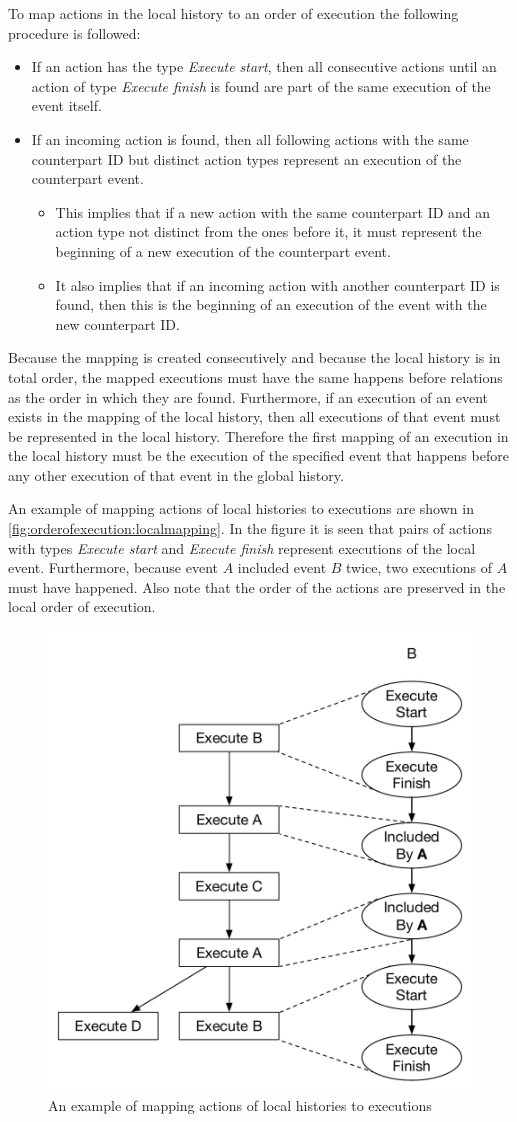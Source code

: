 	\newpar To map actions in the local history to an order of execution the following procedure is followed:

	\begin{itemize}
		\item If an action has the type \textit{Execute start}, then all consecutive actions until an action of type \textit{Execute finish} is found are part of the same execution of the event itself.
		\item If an incoming action is found, then all following actions with the same counterpart ID but distinct action types represent an execution of the counterpart event.
		\begin{itemize}
			\item This implies that if a new action with the same counterpart ID and an action type not distinct from the ones before it, it must represent the beginning of a new execution of the counterpart event.
			\item It also implies that if an incoming action with another counterpart ID is found, then this is the beginning of an execution of the event with the new counterpart ID.
		\end{itemize}
	\end{itemize}
	
	\noindent Because the mapping is created consecutively and because the local history is in total order, the mapped executions must have the same happens before relations as the order in which they are found. Furthermore, if an execution of an event exists in the mapping of the local history, then all executions of that event must be represented in the local history. Therefore the first mapping of an execution in the local history must be the execution of the specified event that  happens before any other execution of that event in the global history.
	
	An example of mapping actions of local histories to executions are shown in \autoref{fig:orderofexecution:localmapping}. In the figure it is seen that pairs of actions with types \textit{Execute start} and \textit{Execute finish} represent executions of the local event. Furthermore, because event $A$ included event $B$ twice, two executions of $A$ must have happened. Also note that the order of the actions are preserved in the local order of execution.
	
	\begin{figure}[H]
		\centering
		\includegraphics[width=.4\textwidth]{5orderofexecution/images/election-mapping.pdf}
		\caption{An example of mapping actions of local histories to executions}
		\label{fig:orderofexecution:localmapping}
	\end{figure}
	

